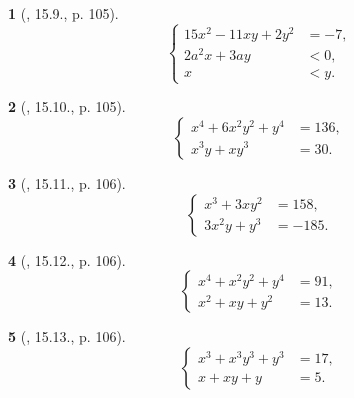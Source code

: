 \documentclass{article}
\newtheorem{baitoan}{}
\begin{document}
\begin{baitoan}[\cite{TLCT_THCS_Toan_9_dai_so}, 15.9., p. 105]
	\begin{equation*}
		\left\{\begin{split}
			15x^2 - 11xy + 2y^2 &= -7,\\
			2a^2x + 3ay &< 0,\\
			x &< y.
		\end{split}\right.
	\end{equation*}
\end{baitoan}

\begin{baitoan}[\cite{TLCT_THCS_Toan_9_dai_so}, 15.10., p. 105]
	\begin{equation*}
		\left\{\begin{split}
			x^4 + 6x^2y^2 + y^4 &= 136,\\
			x^3y + xy^3 &= 30.
		\end{split}\right.
	\end{equation*}
\end{baitoan}

\begin{baitoan}[\cite{TLCT_THCS_Toan_9_dai_so}, 15.11., p. 106]
	\begin{equation*}
		\left\{\begin{split}
			x^3 + 3xy^2 &= 158,\\
			3x^2y + y^3 &= -185.
		\end{split}\right.
	\end{equation*}
\end{baitoan}

\begin{baitoan}[\cite{TLCT_THCS_Toan_9_dai_so}, 15.12., p. 106]
	\begin{equation*}
		\left\{\begin{split}
			x^4 + x^2y^2 + y^4 &= 91,\\
			x^2 + xy + y^2 &= 13.
		\end{split}\right.
	\end{equation*}
\end{baitoan}

\begin{baitoan}[\cite{TLCT_THCS_Toan_9_dai_so}, 15.13., p. 106]
	\begin{equation*}
		\left\{\begin{split}
			x^3 + x^3y^3 + y^3 &= 17,\\
			x + xy + y &= 5.
		\end{split}\right.
	\end{equation*}
\end{baitoan}
\end{document}
